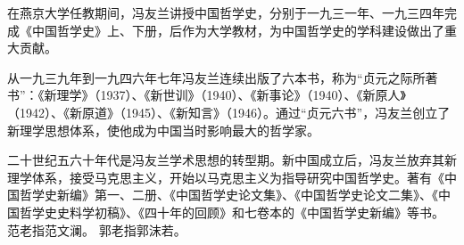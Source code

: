 \begin{maonote}
在燕京大学任教期间，冯友兰讲授中国哲学史，分别于一九三一年、一九三四年完成《中国哲学史》上、下册，后作为大学教材，为中国哲学史的学科建设做出了重大贡献。

从一九三九年到一九四六年七年冯友兰连续出版了六本书，称为“贞元之际所著书”：《新理学》（1937）、《新世训》（1940）、《新事论》（1940）、《新原人》（1942）、《新原道》（1945）、《新知言》（1946）。通过“贞元六书”，冯友兰创立了新理学思想体系，使他成为中国当时影响最大的哲学家。

二十世纪五六十年代是冯友兰学术思想的转型期。新中国成立后，冯友兰放弃其新理学体系，接受马克思主义，开始以马克思主义为指导研究中国哲学史。著有《中国哲学史新编》第一、二册、《中国哲学史论文集》、《中国哲学史论文二集》、《中国哲学史史料学初稿》、《四十年的回顾》和七卷本的《中国哲学史新编》等书。
范老指范文澜。
郭老指郭沫若。
\end{maonote}

